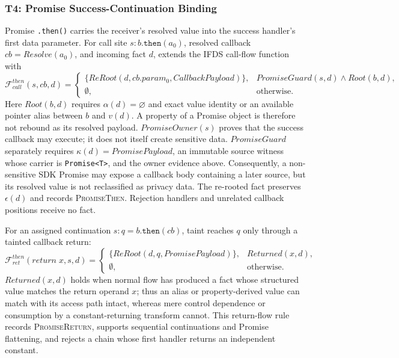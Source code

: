 \subsubsection{T4: Promise Success-Continuation Binding}

Promise \texttt{.then()} carries the receiver's resolved value into the success handler's first data parameter. For call site $s:b.\texttt{then}(a_0)$, resolved callback $cb=Resolve(a_0)$, and incoming fact $d$, \mytool extends the IFDS call-flow function with
\begin{equation}
\mathcal{F}_{call}^{then}(s,cb,d)=
\begin{cases}
\{\mathit{ReRoot}(d,cb.param_0,\mathit{CallbackPayload})\}, &
\mathit{PromiseGuard}(s,d)\land\mathit{Root}(b,d),\\
\emptyset, & \text{otherwise}.
\end{cases}
\end{equation}
Here $\mathit{Root}(b,d)$ requires $\alpha(d)=\varnothing$ and exact value identity or an available pointer alias between $b$ and $v(d)$. A property of a Promise object is therefore not rebound as its resolved payload. $PromiseOwner(s)$ proves that the success callback may execute; it does not itself create sensitive data. $\mathit{PromiseGuard}$ separately requires $\kappa(d)=\mathit{PromisePayload}$, an immutable source witness whose carrier is \texttt{Promise<T>}, and the owner evidence above. Consequently, a non-sensitive SDK Promise may expose a callback body containing a later source, but its resolved value is not reclassified as privacy data. The re-rooted fact preserves $\epsilon(d)$ and records \textsc{PromiseThen}. Rejection handlers and unrelated callback positions receive no fact.

For an assigned continuation $s:q=b.\texttt{then}(cb)$, taint reaches $q$ only through a tainted callback return:
\begin{equation}
\mathcal{F}_{ret}^{then}(return\;x,s,d)=
\begin{cases}
\{\mathit{ReRoot}(d,q,\mathit{PromisePayload})\},&
\mathit{Returned}(x,d),\\
\emptyset,&\text{otherwise}.
\end{cases}
\end{equation}
$\mathit{Returned}(x,d)$ holds when normal flow has produced a fact whose structured value matches the return operand $x$; thus an alias or property-derived value can match with its access path intact, whereas mere control dependence or consumption by a constant-returning transform cannot. This return-flow rule records \textsc{PromiseReturn}, supports sequential continuations and Promise flattening, and rejects a chain whose first handler returns an independent constant.

